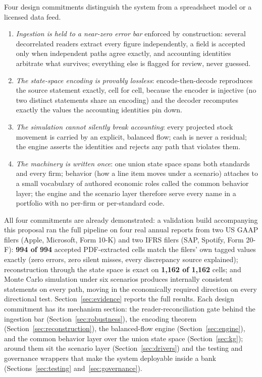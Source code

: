 \documentclass[11pt]{article}
\begin{document}
Four design commitments distinguish the system from a spreadsheet model or a licensed data feed.
\begin{enumerate}
  \item \emph{Ingestion is held to a near-zero error bar} enforced by construction: several decorrelated readers extract every figure independently, a field is accepted only when independent paths agree exactly, and accounting identities arbitrate what survives; everything else is flagged for review, never guessed.
  \item \emph{The state-space encoding is provably lossless}: encode-then-decode reproduces the source statement exactly, cell for cell, because the encoder is injective (no two distinct statements share an encoding) and the decoder recomputes exactly the values the accounting identities pin down.
  \item \emph{The simulation cannot silently break accounting}: every projected stock movement is carried by an explicit, balanced flow; cash is never a residual; the engine asserts the identities and rejects any path that violates them.
  \item \emph{The machinery is written once}: one union state space spans both standards and every firm; behavior (how a line item moves under a scenario) attaches to a small vocabulary of authored economic roles called the common behavior layer; the engine and the scenario layer therefore serve every name in a portfolio with no per-firm or per-standard code.
\end{enumerate}

All four commitments are already demonstrated: a validation build accompanying this proposal ran the full pipeline on four real annual reports from two US GAAP filers (Apple, Microsoft, Form 10-K) and two IFRS filers (SAP, Spotify, Form 20-F): \textbf{994 of 994} accepted PDF-extracted cells match the filers' own tagged values exactly (zero errors, zero silent misses, every discrepancy source explained); reconstruction through the state space is exact on \textbf{1{,}162 of 1{,}162} cells; and Monte Carlo simulation under six scenarios produces internally consistent statements on every path, moving in the economically required direction on every directional test. Section~\ref{sec:evidence} reports the full results. Each design commitment has its mechanism section: the reader-reconciliation gate behind the ingestion bar (Section~\ref{sec:robustness}), the encoding theorem (Section~\ref{sec:reconstruction}), the balanced-flow engine (Section~\ref{sec:engine}), and the common behavior layer over the union state space (Section~\ref{sec:kg}); around them sit the scenario layer (Section~\ref{sec:drivers}) and the testing and governance wrappers that make the system deployable inside a bank (Sections~\ref{sec:testing} and~\ref{sec:governance}).
\end{document}
